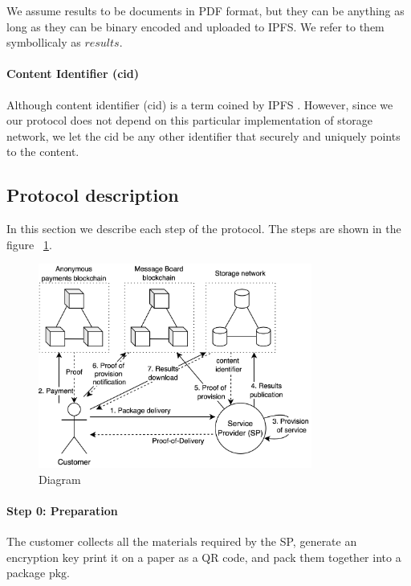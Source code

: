\documentclass{ieeeaccess}
\begin{document}
We assume results to be documents in PDF format, but they can be
anything as long as they can be binary encoded and uploaded to IPFS. We
refer to them symbollicaly as \(results\).

\paragraph{Content Identifier (cid)}\label{content-identifier-cid}

Although content identifier (cid) is a term coined by IPFS
\cite{Contenta59}. However, since we our protocol does not depend on
this particular implementation of storage network, we let the cid be any
other identifier that securely and uniquely points to the content.

\subsection{Protocol description}\label{protocol-description}

In this section we describe each step of the protocol. The steps are
shown in the figure ~\ref{fig:diagram}.

\begin{figure}[h!]
\includegraphics[width=9cm]{anonser-diagram.png}
\centering
\caption{Diagram}
\label{fig:diagram}
\end{figure}

\paragraph{Step 0: Preparation}\label{step-0-preparation}

The customer collects all the $\mathrm{materials}$ required by the SP, generate an encryption $\mathrm{key}$ print it on a paper as a QR code, and pack them together into a package $\mathrm{pkg}$.
\end{document}
